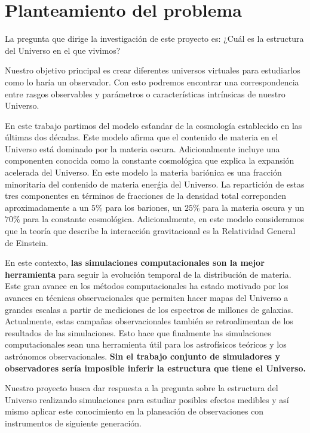 

\section{Planteamiento del problema}

La pregunta que dirige la investigaci\'on de este proyecto es: ¿Cu\'al
es la estructura del Universo en el que vivimos?  

Nuestro objetivo principal es crear diferentes universos virtuales
para estudiarlos como lo har\'ia un observador. Con esto podremos
encontrar una correspondencia entre rasgos observables y
par\'ametros o caracter\'isticas intr\'insicas de nuestro Universo.

En este trabajo partimos del modelo es\'tandar de la cosmolog\'ia
establecido en las \'ultimas dos d\'ecadas. Este modelo afirma que el
contenido de materia en el Universo est\'a dominado por la materia oscura. 
Adicionalmente incluye una componenten conocida como la constante
cosmol\'ogica  que explica la expansi\'on acelerada del Universo. 
En este modelo la materia bari\'onica es una fracci\'on minoritaria
del contenido de materia ener\'gia del Universo. 
La repartici\'on de estas tres componentes en t\'erminos de fracciones
de la densidad total correponden aproximadamente a un $5\%$ para los
bariones, un $25\%$ para la materia oscura y un $70\%$ para la
constante cosmol\'ogica. Adicionalmente, en este modelo consideramos
que la teor\'ia que describe la interacci\'on gravitacional es la
Relatividad General de Einstein. 

En este contexto, {\bf las simulaciones computacionales son la mejor
herramienta} para seguir la evoluci\'on temporal de la distribuci\'on
de materia. 
Este gran avance en los m\'etodos computacionales ha estado motivado por
los avances en t\'ecnicas observacionales que permiten hacer mapas del
Universo a grandes escalas a partir de mediciones de los espectros de
millones de galaxias.   
Actualmente, estas campa\~nas observacionales tambi\'en se
retroalimentan de los resultados de las simulaciones. 
Esto hace que finalmente las simulaciones computacionales sean una
herramienta \'util para los astrof\'isicos te\'oricos y los
astr\'onomos observacionales. {\bf Sin el trabajo conjunto de
  simuladores y observadores ser\'ia imposible inferir la estructura
  que tiene el Universo.} 

Nuestro proyecto busca dar respuesta a la pregunta sobre la
estructura del Universo realizando simulaciones para estudiar posibles
efectos medibles y as\'i mismo aplicar este conocimiento en la
planeaci\'on de observaciones con instrumentos de siguiente
generaci\'on.  

